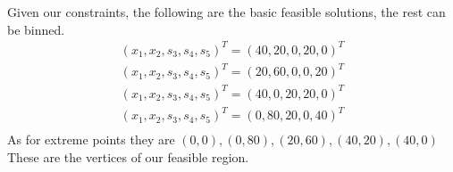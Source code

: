 \documentclass{article}
\begin{document}
Given our constraints, the following are the basic feasible solutions, the rest can be binned.
\begin{align*}
    (x_1,x_2,s_3,s_4,s_5)^T = (40, 20, 0, 20, 0)^T \\
    (x_1,x_2,s_3,s_4,s_5)^T = (20, 60, 0, 0, 20)^T \\
    (x_1,x_2,s_3,s_4,s_5)^T = (40, 0, 20, 20, 0)^T \\
    (x_1,x_2,s_3,s_4,s_5)^T = (0, 80, 20, 0, 40)^T \\ 
\end{align*}
As for extreme points they are $(0,0),(0,80),(20,60),(40,20),(40,0)$ These are the vertices of our feasible region.
\end{document}
